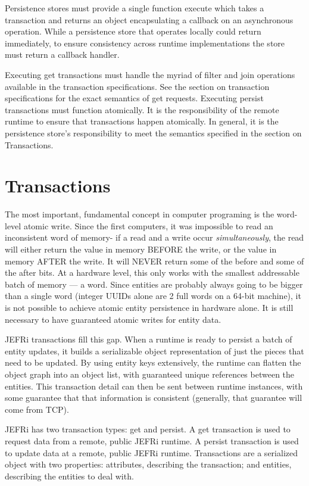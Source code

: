 \documentclass{article}
\renewcommand{\|}{\textbar}
\begin{document}
Persistence stores must provide a single function {\ilcode execute} which
takes a transaction and returns an object encapsulating a callback on an
asynchronous operation. While a persistence store that operates locally could
return immediately, to ensure consistency across runtime implementations the
store must return a callback handler.

Executing {\ilcode get} transactions must handle the myriad of filter and join
operations available in the transaction specifications. See the section on
transaction specifications for the exact semantics of get requests.  Executing
{\ilcode persist} transactions must function atomically.  It is the
responsibility of the remote runtime to ensure that transactions happen
atomically. In general, it is the persistence store's responsibility to meet the
semantics specified in the section on Transactions.

\section{Transactions}

The most important, fundamental concept in computer programing is the word-level
atomic write. Since the first computers, it was impossible to read an
inconsistent word of memory- if a read and a write occur {\sl simultaneously},
the read will either return the value in memory BEFORE the write, or the value
in memory AFTER the write. It will NEVER return some of the before and some of
the after bits. At a hardware level, this only works with the smallest
addressable batch of memory --- a word. Since entities are probably always going
to be bigger than a single word (integer UUIDs alone are 2 full words on a
64-bit machine), it is not possible to achieve atomic entity persistence in
hardware alone. It is still necessary to have guaranteed atomic writes for
entity data.

JEFRi transactions fill this gap. When a runtime is ready to persist a batch
of entity updates, it builds a serializable object representation of just the
pieces that need to be updated. By using entity keys extensively, the runtime
can flatten the object graph into an object list, with guaranteed unique
references between the entities. This transaction detail can then be sent
between runtime instances, with some guarantee that that information is
consistent (generally, that guarantee will come from TCP).

JEFRi has two transaction types: {\ilcode get} and {\ilcode persist}. A {\ilcode
get} transaction is used to request data from a remote, public JEFRi runtime. A
{\ilcode persist} transaction is used to update data at a remote, public JEFRi
runtime. Transactions are a serialized object with two properties: {\ilcode
attributes}, describing the transaction; and {\ilcode entities}, describing the
entities to deal with.
\end{document}
